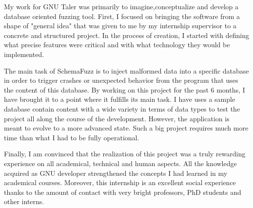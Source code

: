 My work for GNU Taler was primarily to imagine,conceptualize and develop a database oriented fuzzing tool. 
First, I focused on bringing the software from a shape of "general idea" that was given to me by my internship supervisor to a concrete and structured project. In the process of creation, I started with defining what precise features were critical and with what technology they would be implemented.

The main task of SchemaFuzz is to inject malformed data into a specific database in order to trigger crashes or unexpected behavior from the program that uses the content of this database.
By working on this project for the past 6 months, I have brought it to a point where it fulfills its main task. I have uses a sample database contain content with a wide variety in terms of data types to test the project all along the course of the development. However, the application is meant to evolve to a more advanced state. Such a big project requires much more time than what I had to be fully operational.

Finally, I am convinced that the realization of this project was a truly rewarding experience on all academical, technical and human aspects. All the knowledge acquired as GNU developer strengthened the concepts I had learned in my academical courses. Moreover, this internship is an excellent social experience thanks to the amount of contact with very bright professors, PhD students and other interns.     
   
